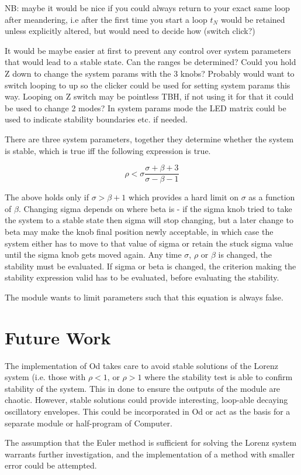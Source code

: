 \documentclass{tufte-handout}
\begin{document}
NB: maybe it would be nice if you could always return to your exact same loop after meandering, i.e after the first time you start a loop $t_N$ would be retained unless explicitly altered, but would need to decide how (switch click?)

It would be maybe easier at first to prevent any control over system parameters that would lead to a stable state. Can the ranges be determined? Could you hold Z down to change the system params with the 3 knobs? Probably would want to switch looping to up so the clicker could be used for setting system params this way. Looping on Z switch may be pointless TBH, if not using it for that it could be used to change 2 modes? In system params mode the LED matrix could be used to indicate stability boundaries etc. if needed.

There are three system parameters, together they determine whether the system is stable, which is true iff the following expression is true.

$$\rho < \sigma \frac{\sigma + \beta + 3}{\sigma - \beta - 1}$$ 

The above holds only if $\sigma > \beta + 1$ which provides a hard limit on $\sigma$ as a function of $\beta$. Changing sigma depends on where beta is - if the sigma knob tried to take the system to a stable state then sigma will stop changing, but a later change to beta may make the knob final position newly acceptable, in which case the system either has to move to that value of sigma or retain the stuck sigma value until the sigma knob gets moved again.
Any time $\sigma$, $\rho$ or $\beta$ is changed, the stability must be evaluated. If sigma or beta is changed, the criterion making the stability expression valid has to be evaluated, before evaluating the stability.

The module wants to limit parameters such that this equation is always false.

\section{Future Work}\label{sec:future_work}

The implementation of Od takes care to avoid stable solutions of the Lorenz system (i.e. those with $\rho < 1$, or $\rho > 1$ where the stability test is able to confirm stability of the system. This in done to ensure the outputs of the module are chaotic. However, stable solutions could provide interesting, loop-able decaying oscillatory envelopes. This could be incorporated in Od or act as the basis for a separate module or half-program of Computer.

The assumption that the Euler method is sufficient for solving the Lorenz system warrants further investigation, and the implementation of a method with smaller error could be attempted.




\end{document}
